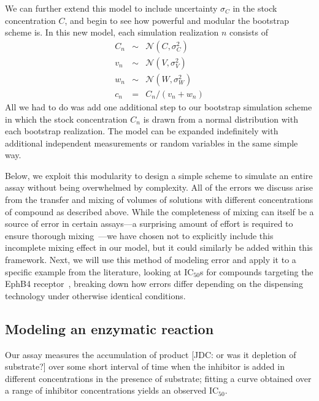 \documentclass[aps,pre,twocolumn,nofootinbib,superscriptaddress,linenumbers]{revtex4-1}
\begin{document}
We can further extend this model to include uncertainty $\sigma_C$ in the stock concentration $C$, and begin to see how powerful and modular the bootstrap scheme is.
In this new model, each simulation realization $n$ consists of
\begin{eqnarray}
C_n &\sim& \mathcal{N}(C, \sigma_C^2) \nonumber \\
v_n &\sim& \mathcal{N}(V, \sigma_V^2) \nonumber \\
w_n &\sim& \mathcal{N}(W, \sigma_W^2) \nonumber \\
c_n &=& C_n / (v_n + w_n)
\end{eqnarray}
All we had to do was add one additional step to our bootstrap simulation scheme in which the stock concentration $C_n$ is drawn from a normal distribution with each bootstrap realization.
The model can be expanded indefinitely with additional independent measurements or random variables in the same simple way.

Below, we exploit this modularity to design a simple scheme to simulate an entire assay without being overwhelmed by complexity.
All of the errors we discuss arise  from the transfer and mixing of volumes of solutions with different concentrations of compound as described above.
While the completeness of mixing can itself be a source of error in certain assays---a surprising amount of effort is required to ensure thorough mixing~\cite{walling_mixing_2007,weiss_modeling_2002,mitre_turbo-mixing_2007}---we have chosen not to explicitly include this incomplete mixing effect in our model, but it could similarly be added within this framework.
Next, we will use this method of modeling error and apply it to a specific example from the literature, looking at IC$_{50}$s for compounds targeting the EphB4 receptor~\cite{ekins_dispensing_2013,barlaam_novel_2009,barlaam_pyrimidine_2010}, breaking down how errors differ depending on the dispensing technology under otherwise identical conditions.

\subsection*{Modeling an enzymatic reaction}

Our assay measures the accumulation of product {\color{red}[JDC: or was it depletion of substrate?]} over some short interval of time when the inhibitor is added in different concentrations in the presence of substrate; fitting a curve obtained over a range of inhibitor concentrations yields an observed IC$_{50}$.
\end{document}
